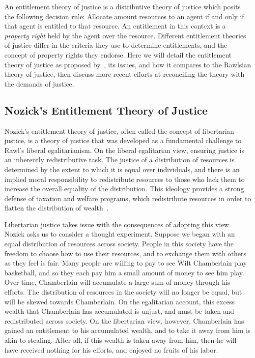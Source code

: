 An entitlement theory of justice is a distributive theory of justice which
posits the following decision rule: Allocate amount resources to an agent if and
only if that agent is entitled to that resource. An entitlement in this
context is a \textit{property right} held by the agent over the resource. 
Different entitlement theories of justice differ in the criteria they use to 
determine entitlements, and the concept of property rights they endorse.
Here we will detail the entitlement theory of justice as proposed
by~\cite{Nozick_1974}, its issues, and how it compares to the Rawlsian theory of
justice, then discuss more recent efforts at reconciling the theory with the
demands of justice.

\subsection{Nozick's Entitlement Theory of Justice}

Nozick's entitlement theory of justice, often called the concept of libertarian
justice, is a theory of justice that was developed as a fundamental challenge to
Rawl's liberal egalitarianism. On the liberal egalitarian view, ensuring justice
is an inherently redistributive task. The justice of a distribution of resources
is determined by the extent to which it is equal over individuals, and there is
an implied moral responsibility to redistribute resources to those who lack them
to increase the overall equality of the distribution. This ideology provides a
strong defense of taxation and welfare programs, which redistribute resources
in order to flatten the distribution of wealth~\citep{Rawls_1971}.

Libertarian justice takes issue with the consequences of adopting this view.
Nozick asks us to consider a thought experiment. Suppose we began with an equal
distribution of resources across society. People in this society have the
freedom to choose how to use their resources, and to exchange them with others 
as they feel is fair. Many people are willing to pay to see Wilt Chamberlain 
play basketball, and so they each pay him a small amount of money to see him 
play. Over time, Chamberlain will accumulate a large sum of money through his 
efforts. The distribution of resources in the society will no longer be equal,
but will be skewed towards Chamberlain. On the egalitarian account, this excess 
wealth that Chamberlain has accumulated is unjust, and must be taken and
redistributed across society. On the libertarian view, however, Chamberlain has
gained an entitlement to his accumulated wealth, and to take it away from him
is akin to stealing. After all, if this wealth is taken away from him, then he
will have received nothing for his efforts, and enjoyed no fruits of his labor.

